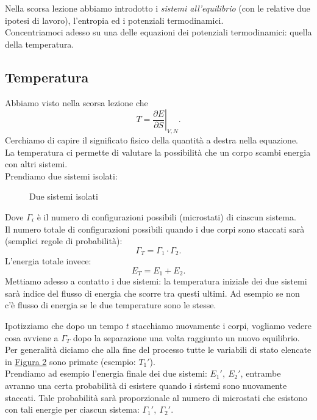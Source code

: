 Nella scorsa lezione abbiamo introdotto i \textit{sistemi all'equilibrio} (con le relative due ipotesi di lavoro), l'entropia ed i potenziali termodinamici.\\
Concentriamoci adesso su una delle equazioni dei potenziali termodinamici: quella della temperatura.
\subsection{Temperatura}
Abbiamo visto nella scorsa lezione che \[
	T = \left.\frac{\partial E}{\partial S} \right|_{V,N}
.\] 
Cerchiamo di capire il significato fisico della quantità a destra nella equazione.\\
La temperatura ci permette di valutare la possibilità che un corpo scambi energia con altri sistemi.\\
Prendiamo due sistemi isolati:\\
\begin{figure}[H]
    \centering
    \caption{Due sistemi isolati}
    \label{fig:due-sistemi-isolati}
\end{figure}
\noindent Dove $\Gamma_{i}$ è il numero di configurazioni possibili (microstati) di ciascun sistema.\\
Il numero totale di configurazioni possibili quando i due corpi sono staccati sarà (semplici regole di probabilità):
\[
	\Gamma_{T} = \Gamma_1\cdot  \Gamma_2
.\] 
L'energia totale invece:
\[
	E_{T}= E_1+E_2
.\] 
Mettiamo adesso a contatto i due sistemi: la temperatura iniziale dei due sistemi sarà indice del flusso di energia che scorre tra questi ultimi. Ad esempio se non c'è flusso di energia se le due temperature sono le stesse. 
\begin{figure}[H]
    \centering
    \label{fig:sistemi-collegati}
\end{figure}
\noindent Ipotizziamo che dopo un tempo $t$ stacchiamo nuovamente i corpi, vogliamo vedere cosa avviene a $\Gamma_{T}$ dopo la separazione una volta raggiunto un nuovo equilibrio. Per generalità diciamo che alla fine del processo tutte le variabili di stato elencate in \hyperref[fig:due-sistemi-isolati]{Figura 2} sono primate (esempio: $T_1'$).\\
Prendiamo ad esempio l'energia finale dei due sistemi: $E_1', \ E_2'$, entrambe avranno una certa probabilità di esistere quando i sistemi sono nuovamente staccati. Tale probabilità sarà proporzionale al numero di microstati che esistono con tali energie per ciascun sistema: $\Gamma_1', \ \Gamma_2'$.\\ 
